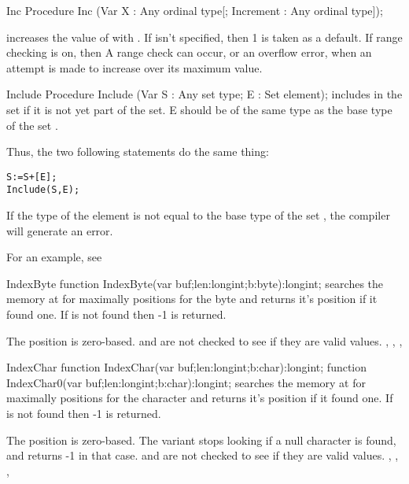 
\begin{procedure}{Inc}
\Declaration
Procedure Inc (Var X : Any ordinal type[; Increment : Any ordinal type]);

\Description
{} increases the value of  with .
If  isn't specified, then 1 is taken as a default.
\Errors
If range checking is on, then A range check can occur, or an overflow
error, when an attempt is made to increase  over its maximum value.
\SeeAlso
{}
\end{procedure}


\begin{procedure}{Include}
\Declaration
Procedure Include (Var S : Any set type; E : Set element);
\Description
{} includes  in the set  if it is
not yet part of the set. E should be of the same type as the base type
of the set .

Thus, the two following statements do the same thing:
\begin{verbatim}
S:=S+[E];
Include(S,E);
\end{verbatim}
\Errors
If the type of the element  is not equal to the base type of the
set , the compiler will generate an error.
\SeeAlso
{}
\end{procedure}

For an example, see 

\begin{function}{IndexByte}
\Declaration
function  IndexByte(var buf;len:longint;b:byte):longint;
\Description
{} searches the memory at  for maximally 
positions for the byte  and returns it's position if it found one.
If  is not found then -1 is returned.

The position is zero-based.
\Errors
{} and  are not checked to see if they are valid values.
\SeeAlso
{}, , , 
\end{function}


\begin{function}{IndexChar}
\Declaration
function  IndexChar(var buf;len:longint;b:char):longint;
\Declaration
function  IndexChar0(var buf;len:longint;b:char):longint;
\Description
{} searches the memory at  for maximally 
positions for the character  and returns it's position if it found one.
If  is not found then -1 is returned.

The position is zero-based. The  variant stops looking if
a null character is found, and returns -1 in that case.
\Errors
{} and  are not checked to see if they are valid values.
\SeeAlso
{}, , , 
\end{function}

